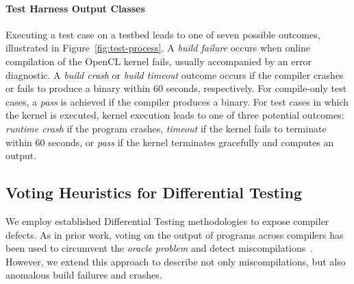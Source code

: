 \paragraph*{Test Harness Output Classes} Executing a test case on a testbed leads to one of seven possible outcomes, illustrated in Figure~\ref{fig:test-process}.
A \emph{build failure} occurs when online compilation of the OpenCL kernel fails, usually accompanied by an error diagnostic.
A \emph{build crash} or \emph{build timeout} outcome occurs if the compiler crashes or fails to produce a binary within 60 seconds, respectively.
For compile-only test cases, a \emph{pass} is achieved if the compiler produces a binary.
For test cases in which the kernel is executed, kernel execution leads to one of three potential outcomes:
\emph{runtime crash} if the program crashes,
\emph{timeout} if the kernel fails to terminate within 60 seconds,
or \emph{pass} if the kernel terminates gracefully and computes an output.

\subsection{Voting Heuristics for Differential Testing}

We employ established Differential Testing methodologies to expose compiler defects. As in prior work, voting on the output of programs across compilers has been used to circumvent the \emph{oracle problem} and detect miscompilations~\cite{McKeeman1998}. However, we extend this approach to describe not only miscompilations, but also anomalous build failures and crashes.


%

